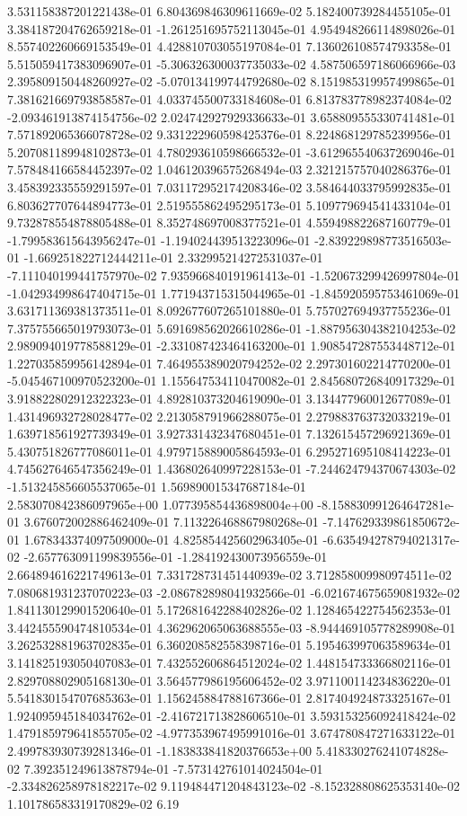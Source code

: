 3.531158387201221438e-01	6.804369846309611669e-02	5.182400739284455105e-01	3.384187204762659218e-01	-1.261251695752113045e-01	4.954948266114898026e-01	8.557402260669153549e-01	4.428810703055197084e-01	7.136026108574793358e-01	5.515059417383096907e-01	-5.306326300037735033e-02	4.587506597186066966e-03	2.395809150448260927e-02	-5.070134199744792680e-02	8.151985319957499865e-01	7.381621669793858587e-01	4.033745500733184608e-01	6.813783778982374084e-02	-2.093461913874154756e-02	2.024742927929336633e-01	3.658809555330741481e-01	7.571892065366078728e-02	9.331222960598425376e-01	8.224868129785239956e-01	5.207081189948102873e-01	4.780293610598666532e-01	-3.612965540637269046e-01	7.578484166584452397e-02	1.046120396575268494e-03	2.321215757040286376e-01	3.458392335559291597e-01	7.031172952174208346e-02	3.584644033795992835e-01	6.803627707644894773e-01	2.519555862495295173e-01	5.109779694541433104e-01	9.732878554878805488e-01	8.352748697008377521e-01	4.559498822687160779e-01	-1.799583615643956247e-01	-1.194024439513223096e-01	-2.839229898773516503e-01	-1.669251822712444211e-01	2.332995214272531037e-01	-7.111040199441757970e-02	7.935966840191961413e-01	-1.520673299426997804e-01	-1.042934998647404715e-01	1.771943715315044965e-01	-1.845920595753461069e-01	3.631711369381373511e-01	8.092677607265101880e-01	5.757027694937755236e-01	7.375755665019793073e-01	5.691698562026610286e-01	-1.887956304382104253e-02	2.989094019778588129e-01	-2.331087423464163200e-01	1.908547287553448712e-01	1.227035859956142894e-01	7.464955389020794252e-02	2.297301602214770200e-01	-5.045467100970523200e-01	1.155647534110470082e-01	2.845680726840917329e-01	3.918822802912322323e-01	4.892810373204619090e-01	3.134477960012677089e-01	1.431496932728028477e-02	2.213058791966288075e-01	2.279883763732033219e-01	1.639718561927739349e-01	3.927331432347680451e-01	7.132615457296921369e-01	5.430751826777086011e-01	4.979715889005864593e-01	6.295271695108414223e-01	4.745627646547356249e-01	1.436802640997228153e-01	-7.244624794370674303e-02	-1.513245856605537065e-01	1.569890015347687184e-01	2.583070842386097965e+00	1.077395854436898004e+00	-8.158830991264647281e-01	3.676072002886462409e-01	7.113226468867980268e-01	-7.147629339861850672e-01	1.678343374097509000e-01	4.825854425602963405e-01	-6.635494278794021317e-02	-2.657763091199839556e-01	-1.284192430073956559e-01	2.664894616221749613e-01	7.331728731451440939e-02	3.712858009980974511e-02	7.080681931237070223e-03	-2.086782898041932566e-01	-6.021674675659081932e-02	1.841130129901520640e-01	5.172681642288402826e-02	1.128465422754562353e-01	3.442455590474810534e-01	4.362962065063688555e-03	-8.944469105778289908e-01	3.262532881963702835e-01	6.360208582558398716e-01	5.195463997063589634e-01	3.141825193050407083e-01	7.432552606864512024e-02	1.448154733366802116e-01	2.829708802905168130e-01	3.564577986195606452e-02	3.971100114234836220e-01	5.541830154707685363e-01	1.156245884788167366e-01	2.817404924873325167e-01	1.924095945184034762e-01	-2.416721713828606510e-01	3.593153256092418424e-02	1.479185979641855705e-02	-4.977353967495991016e-01	3.674780847271633122e-01	2.499783930739281346e-01	-1.183833841820376653e+00	5.418330276241074828e-02	7.392351249613878794e-01	-7.573142761014024504e-01	-2.334826258978182217e-02	9.119484471204843123e-02	-8.152328808625353140e-02	1.101786583319170829e-02	6.19